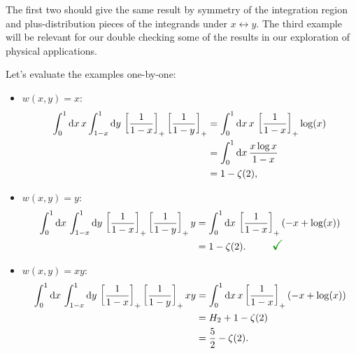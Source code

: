 \begin{subappendices}
\begin{example}
The first two should give the same result by symmetry of the integration region and plus-distribution pieces of the integrands under \(x \leftrightarrow y\).
%
The third example will be relevant for our double checking some of the results in our exploration of physical applications.

Let's evaluate the examples one-by-one:
\begin{itemize}
    \item
        \(w(x,y) = x\):
        \begin{align}
            \int_{0}^{1} \dd x\,
            x
            \int_{1-x}^{1} \dd y\,
            \left[\frac{1}{1-x}\right]_+
            \left[\frac{1}{1-y}\right]_+
            &=
            \int_{0}^{1} \dd x\,x\,
            \left[\frac{1}{1-x}\right]_+
            \log(x)
            \\
            &=
            \int_{0}^{1} \dd x\,
            \frac{x \log x}{1-x}
            \notag
            \\
            &= 1 - \zeta(2)
            \notag
            ,
        \end{align}

    \item
        \(w(x,y) = y\):
        \begin{align}
            \int_{0}^{1} \dd x\,
            \int_{1-x}^{1} \dd y\,
            \le[\frac{1}{1-x}\ri]_+
            \le[\frac{1}{1-y}\ri]_+
            y
            &=
            \int_{0}^{1} \dd x\,
            \le[\frac{1}{1-x}\ri]_+
            \le(-x + \log(x)\ri)
            \\
            &=
            1 - \zeta(2)
            \notag
            .
            ~~~~~~~~
            {\Large \textbf{\textcolor{green!60!black}{\checkmark}}}
        \end{align}

    \item
        \(w(x,y) = x y\):
        \begin{align}
            \int_{0}^{1} \dd x\,
            \int_{1-x}^{1} \dd y\,
            \left[\frac{1}{1-x}\right]_+
            \left[\frac{1}{1-y}\right]_+
            x y
            &=
            \int_{0}^{1} \dd x\,x
            \left[\frac{1}{1-x}\right]_+
            \left(-x + \log(x)\right)
            \\
            &=
            H_2 + 1 - \zeta(2)
            \notag
            \\
            &=
            \frac{5}{2} - \zeta(2)
            \notag
            .
        \end{align}
\end{itemize}
\end{example}




\end{subappendices}
